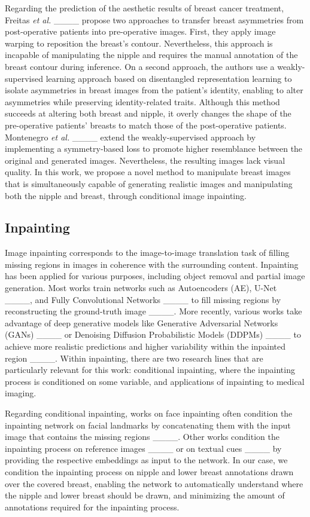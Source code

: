 Regarding the prediction of the aesthetic results of breast cancer treatment, Freitas \textit{et al.} ____ propose two approaches to transfer breast asymmetries from post-operative patients into pre-operative images. First, they apply image warping to reposition the breast's contour. Nevertheless, this approach is incapable of manipulating the nipple and requires the manual annotation of the breast contour during inference. On a second approach, the authors use a weakly-supervised learning approach based on disentangled representation learning to isolate asymmetries in breast images from the patient's identity, enabling to alter asymmetries while preserving identity-related traits. Although this method succeeds at altering both breast and nipple, it overly changes the shape of the pre-operative patients' breasts to match those of the post-operative patients. Montenegro \textit{et al.} ____ extend the weakly-supervised approach by implementing a symmetry-based loss to promote higher resemblance between the original and generated images. Nevertheless, the resulting images lack visual quality. In this work, we propose a novel method to manipulate breast images that is simultaneously capable of generating realistic images and manipulating both the nipple and breast, through conditional image inpainting. 

\subsection{Inpainting}

Image inpainting corresponds to the image-to-image translation task of filling missing regions in images in coherence with the surrounding content. Inpainting has been applied for various purposes, including object removal and partial image generation. Most works train networks such as Autoencoders (AE), U-Net ____, and Fully Convolutional Networks ____ to fill missing regions by reconstructing the ground-truth image ____. More recently, various works take advantage of deep generative models like Generative Adversarial Networks (GANs) ____ or Denoising Diffusion Probabilistic Models (DDPMs) ____ to achieve more realistic predictions and higher variability within the inpainted region ____. Within inpainting, there are two research lines that are particularly relevant for this work: conditional inpainting, where the inpainting process is conditioned on some variable, and applications of inpainting to medical imaging. 

Regarding conditional inpainting, works on face inpainting often condition the inpainting network on facial landmarks by concatenating them with the input image that contains the missing regions ____. Other works condition the inpainting process on reference images ____ or on textual cues ____ by providing the respective embeddings as input to the network. In our case, we condition the inpainting process on nipple and lower breast annotations drawn over the covered breast, enabling the network to automatically understand where the nipple and lower breast should be drawn, and minimizing the amount of annotations required for the inpainting process. 

